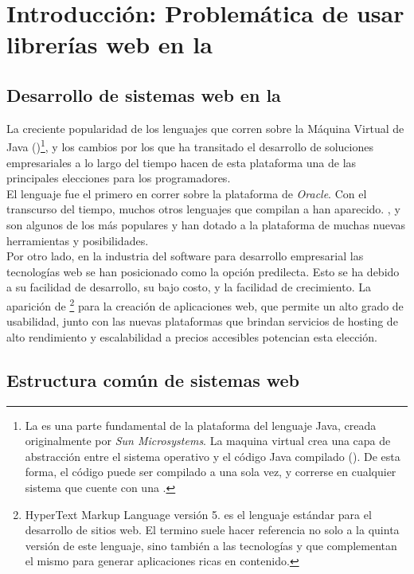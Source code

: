 \section{Introducción: Problemática de usar librerías web en la \jvm}
\label{sec:intro}

\subsection{Desarrollo de sistemas web en la \jvm}
\label{subsec:intro:jvm_dev}

La creciente popularidad de los lenguajes que corren sobre la Máquina Virtual 
de Java (\jvm)\footnote{
	La \jvm es una parte fundamental de la plataforma del lenguaje Java,
	creada originalmente por \emph{Sun Microsystems}. La maquina virtual crea 
	una capa de abstracción entre el sistema operativo y el código Java 
	compilado (\bytecode). De esta forma, el código \java puede ser compilado a 
	\bytecode una sola vez, y correrse en cualquier sistema que cuente con una 
	\jvm.
}, y los cambios por los que ha transitado el desarrollo de 
soluciones empresariales a lo largo del tiempo hacen de esta plataforma una de 
las principales elecciones para los programadores.\\
El lenguaje \java fue el primero en correr sobre la plataforma de 
\emph{Oracle}. Con el transcurso del tiempo, muchos otros lenguajes que 
compilan a \bytecode \java han aparecido. \scala, \clojure y \groovy son 
algunos de los más populares y han dotado a la  plataforma de muchas nuevas 
herramientas y posibilidades.\\
Por otro lado, en la industria del software para desarrollo empresarial las 
tecnologías web se han posicionado como la opción predilecta. Esto se ha debido 
a su facilidad de desarrollo, su bajo costo, y la facilidad de crecimiento.
La aparición de \htmlv\footnote{
	HyperText Markup Language versión 5. \html es el lenguaje estándar para el 
	desarrollo de sitios web. El termino \htmlv suele hacer referencia no solo 
	a la quinta versión de este lenguaje, sino también a las tecnologías 
	\js y \css que complementan el mismo para generar aplicaciones 
	ricas en contenido.
} para la creación de aplicaciones web, que permite un 
alto grado de usabilidad, junto con las nuevas plataformas que brindan 
servicios de hosting de alto rendimiento y escalabilidad a precios accesibles 
potencian esta elección.\\

\subsection{Estructura común de sistemas web}
\label{subsec:intro:jvm_dev:structure}

